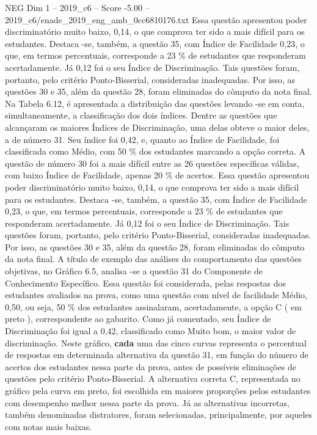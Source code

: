 \begin{textsample}{NEG Dim 1 – 2019\_c6 – Score -5.00 – 2019\_c6/enade\_2019\_eng\_amb\_0cc6810176.txt}
Essa questão apresentou poder discriminatório muito baixo, 0,14, o que comprova ter sido a mais difícil para os estudantes.
Destaca -se, também, a questão 35, com Índice de Facilidade 0,23, o que, em termos percentuais, corresponde a 23 \% de estudantes que responderam acertadamente.
Já 0,12 foi o seu Índice de Discriminação.
Tais questões foram, portanto, pelo critério Ponto-Bisserial, consideradas inadequadas.
Por isso, as questões 30 e 35, além da questão 28, foram eliminadas do cômputo da nota final.
Na Tabela 6.12, é apresentada a distribuição das questões levando -se em conta, simultaneamente, a classificação dos dois índices.
Dentre as questões que alcançaram os maiores Índices de Discriminação, uma delas obteve o maior deles, a de número 31.
Seu índice foi 0,42, e, quanto ao Índice de Facilidade, foi classificada como Médio, com 50 \% dos estudantes marcando a opção correta.
A questão de número 30 foi a mais difícil entre as 26 questões específicas válidas, com baixo Índice de Facilidade, apenas 20 \% de acertos.
Essa questão apresentou poder discriminatório muito baixo, 0,14, o que comprova ter sido a mais difícil para os estudantes.
Destaca -se, também, a questão 35, com Índice de Facilidade 0,23, o que, em termos percentuais, corresponde a 23 \% de estudantes que responderam acertadamente.
Já 0,12 foi o seu Índice de Discriminação.
Tais questões foram, portanto, pelo critério Ponto-Bisserial, consideradas inadequadas.
Por isso, as questões 30 e 35, além da questão 28, foram eliminadas do cômputo da nota final.
A título de exemplo das análises do comportamento das questões objetivas, no Gráfico 6.5, analisa -se a questão 31 do Componente de Conhecimento Específico.
Essa questão foi considerada, pelas respostas dos estudantes avaliados na prova, como uma questão com nível de facilidade Médio, 0,50, ou seja, 50 \% dos estudantes assinalaram, acertadamente, a opção C ( em preto ), correspondente ao gabarito.
Como já comentado, seu Índice de Discriminação foi igual a 0,42, classificado como Muito bom, o maior valor de discriminação.
Neste gráfico, \textbf{cada} uma das cinco curvas representa o percentual de respostas em determinada alternativa da questão 31, em função do número de acertos dos estudantes nessa parte da prova, antes de possíveis eliminações de questões pelo critério Ponto-Bisserial.
A alternativa correta C, representada no gráfico pela curva em preto, foi escolhida em maiores proporções pelos estudantes com desempenho melhor nessa parte da prova.
Já as alternativas incorretas, também denominadas distratores, foram selecionadas, principalmente, por aqueles com notas mais baixas.

\end{textsample}
